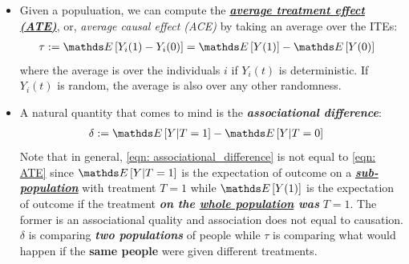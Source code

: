 \documentclass[11pt]{article}
\begin{document}
\begin{itemize}
\item Given a populuation, we can compute the \underline{\emph{\textbf{average treatment effect (ATE)}}}, or, \emph{average causal effect (ACE)} \citep{neal2020introduction}  by taking an average over the ITEs:
\begin{align}
\tau &:=  \E{}{Y_i(1) - Y_i(0)} =  \E{}{Y(1)} -\E{}{Y(0)} \label{eqn: ATE}
\end{align} where the average is over the individuals $i$ if $Y_i(t)$ is deterministic. If $Y_i(t)$ is random, the average is also over any other randomness.

\item A natural quantity that comes to mind is the \emph{\textbf{associational difference}}:
\begin{align}
\delta &:= \E{}{Y| T = 1} - \E{}{Y| T = 0} \label{eqn: associational_difference}
\end{align} Note that in general,  \eqref{eqn: associational_difference} is not equal to \eqref{eqn: ATE} since $\E{}{Y| T = 1}$ is the expectation of outcome on a \underline{\emph{\textbf{sub-population}}} with treatment $T=1$ while $ \E{}{Y(1)}$ is the expectation of outcome if the treatment \emph{\textbf{on the \underline{whole population} was}} $T=1$.  The former is an associational quality and association does not equal to causation. $\delta$ is comparing \emph{\textbf{two populations}} of people while $\tau$ is comparing what would happen if the \textbf{same people} were given different treatments.
\end{itemize}
\end{document}
